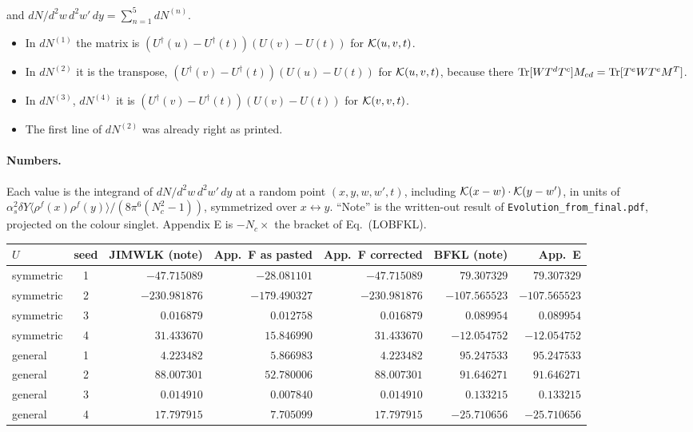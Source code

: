 \documentclass[10pt]{article}
\begin{document}
and $dN/d^2w\,d^2w'\,dy=\sum_{n=1}^5dN^{(n)}$.
\begin{itemize}
\item In $dN^{(1)}$ the matrix is $(U^\dagger(u)-U^\dagger(t))(U(v)-U(t))$ for ${\cal K}(u,v,t)$.
\item In $dN^{(2)}$ it is the transpose, $(U^\dagger(v)-U^\dagger(t))(U(u)-U(t))$ for ${\cal K}(u,v,t)$, because there ${\rm Tr}[WT^dT^c]M_{cd}={\rm Tr}[T^eWT^eM^T]$.
\item In $dN^{(3)}$, $dN^{(4)}$ it is $(U^\dagger(v)-U^\dagger(t))(U(v)-U(t))$ for ${\cal K}(v,v,t)$.
\item The first line of $dN^{(2)}$ was already right as printed.
\end{itemize}

\paragraph{Numbers.} Each value is the integrand of $dN/d^2w\,d^2w'\,dy$ at a random point $(x,y,w,w',t)$, including ${\cal K}(x-w)\cdot{\cal K}(y-w')$, in units of $\alpha_s^2\delta Y\langle\rho^f(x)\rho^f(y)\rangle/(8\pi^6(N_c^2-1))$, symmetrized over $x\leftrightarrow y$. ``Note'' is the written-out result of \texttt{Evolution\_from\_final.pdf}, projected on the colour singlet. Appendix E is $-N_c\times$ the bracket of Eq.~(LOBFKL).
\begin{center}\small
\begin{tabular}{@{}l c r r r r r@{}}
\toprule
$U$ & seed & JIMWLK (note) & App.~F as pasted & App.~F corrected & BFKL (note) & App.~E\\ \midrule
symmetric & 1 & $-47.715089$ & $-28.081101$ & $-47.715089$ & $79.307329$ & $79.307329$\\
symmetric & 2 & $-230.981876$ & $-179.490327$ & $-230.981876$ & $-107.565523$ & $-107.565523$\\
symmetric & 3 & $0.016879$ & $0.012758$ & $0.016879$ & $0.089954$ & $0.089954$\\
symmetric & 4 & $31.433670$ & $15.846990$ & $31.433670$ & $-12.054752$ & $-12.054752$\\
general & 1 & $4.223482$ & $5.866983$ & $4.223482$ & $95.247533$ & $95.247533$\\
general & 2 & $88.007301$ & $52.780006$ & $88.007301$ & $91.646271$ & $91.646271$\\
general & 3 & $0.014910$ & $0.007840$ & $0.014910$ & $0.133215$ & $0.133215$\\
general & 4 & $17.797915$ & $7.705099$ & $17.797915$ & $-25.710656$ & $-25.710656$\\
\bottomrule
\end{tabular}
\end{center}
\end{document}
